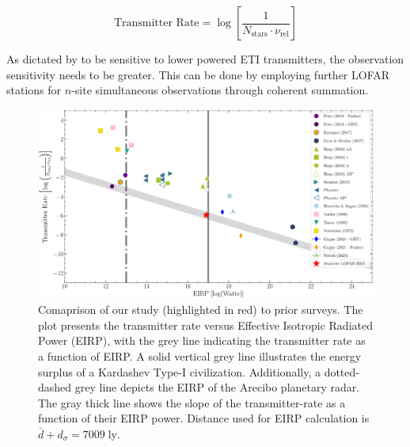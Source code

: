  \begin{equation}
     \text{Transmitter Rate} = \log \left[ \dfrac{1}{N_{\text{stars}} \cdot \nu_{\text{rel}}} \right]
     \label{eq:transmitter_rate}
 \end{equation}

As dictated by  to be sensitive to lower powered ETI transmitters, the observation sensitivity needs to be greater. This can be done by employing further LOFAR stations for $n$-site simultaneous observations through coherent summation.
 
\begin{figure}
    \centering
    \includegraphics[width=\linewidth]{SETI/figures/SETI_limits_comparison.pdf}
    \caption{Comaprison of our study (highlighted in red) to prior surveys. The plot presents the transmitter rate versus Effective Isotropic Radiated Power (EIRP), with the grey line indicating the transmitter rate as a function of EIRP. A solid vertical grey line illustrates the energy surplus of a Kardashev Type-I civilization. Additionally, a dotted-dashed grey line depicts the EIRP of the Arecibo planetary radar. The gray thick line shows the slope
    of the transmitter-rate as a function of their EIRP power.  Distance used for EIRP calculation is $\bar d + d_\sigma = 7009 \; \text{ly}$.
    \label{fig:EIRP_compare}}
\end{figure}

